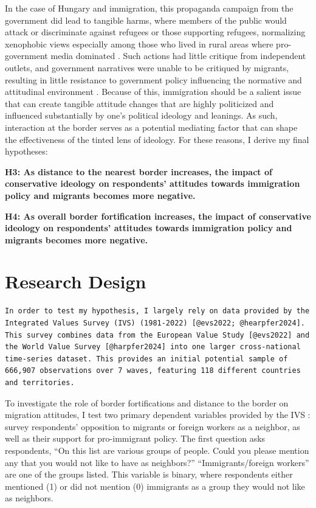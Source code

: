 \documentclass[12pt,]{article}
\begin{document}
In the case of Hungary and immigration, this propaganda campaign from
the government did lead to tangible harms, where members of the public
would attack or discriminate against refugees or those supporting
refugees, normalizing xenophobic views especially among those who lived
in rural areas where pro-government media dominated
\citep{bajomi-lazar2019}. Such actions had little critique from
independent outlets, and government narratives were unable to be
critiqued by migrants, resulting in little resistance to government
policy influencing the normative and attitudinal environment
\citep{bajomi-lazar2019}. Because of this, immigration should be a
salient issue that can create tangible attitude changes that are highly
politicized and influenced substantially by one's political ideology and
leanings. As such, interaction at the border serves as a potential
mediating factor that can shape the effectiveness of the tinted lens of
ideology. For these reasons, I derive my final hypotheses:

\textbf{H3: As distance to the nearest border increases, the impact of
conservative ideology on respondents' attitudes towards immigration
policy and migrants becomes more negative.}

\textbf{H4: As overall border fortification increases, the impact of
conservative ideology on respondents' attitudes towards immigration
policy and migrants becomes more negative.}

\section{Research Design}\label{research-design}

\begin{verbatim}
In order to test my hypothesis, I largely rely on data provided by the Integrated Values Survey (IVS) (1981-2022) [@evs2022; @hearpfer2024]. This survey combines data from the European Value Study [@evs2022] and the World Value Survey [@harpfer2024] into one larger cross-national time-series dataset. This provides an initial potential sample of 666,907 observations over 7 waves, featuring 118 different countries and territories. 
\end{verbatim}

To investigate the role of border fortifications and distance to the
border on migration attitudes, I test two primary dependent variables
provided by the IVS \citep{evs2022, hearpfer2024}: survey respondents'
opposition to migrants or foreign workers as a neighbor, as well as
their support for pro-immigrant policy. The first question asks
respondents, ``On this list are various groups of people. Could you
please mention any that you would not like to have as neighbors?''
``Immigrants/foreign workers'' are one of the groups listed. This
variable is binary, where respondents either mentioned (1) or did not
mention (0) immigrants as a group they would not like as neighbors.
\end{document}
